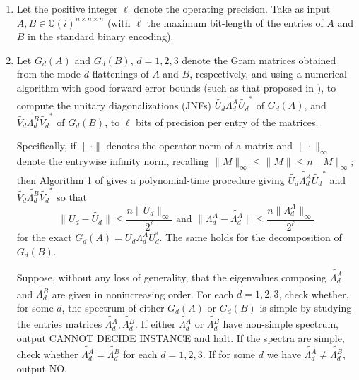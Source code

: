 \documentclass[11pt]{article}
\numberwithin{equation}{section}
\theoremstyle{remark}
\newcommand{\QQ}{\mathbb{Q}}
\begin{document}
\begin{algorithm}[H]
\caption{Compact orbit distance decision procedure for unitary actions.}
\label{alg:2}
    \begin{enumerate}[label=Step \arabic*]
    \item [\textbf{Input}]  Let the positive integer $\ell$ denote the operating precision. Take as input $A, B \in \QQ(i)^{n\times n \times n}$ (with $\ell$ the maximum bit-length of the entries of $A$ and $B$ in the standard binary encoding).
    
    \item\label{alg2Step1}
    Let $G_d(A)$ and $G_d(B)$, $d=1,2,3$ denote the Gram matrices obtained from the mode-$d$ flattenings of $A$ and $B$, respectively, and using a numerical algorithm with good forward error bounds (such as that proposed in \cite{dey2023bit}), to compute the unitary diagonalizations (JNFs) $\widetilde{U_d} \widetilde{\Lambda_d^A} \widetilde{U_d}^*$ of $G_d(A)$, and $\widetilde{V_d} \widetilde{\Lambda_d^B} \widetilde{V_d}^*$ of $G_d(B)$, to $\ell$ bits of precision per entry of the matrices.
    
    Specifically, if $\|\cdot\|$ denotes the operator norm of a matrix and $\|\cdot\|_\infty$ denote the entrywise infinity norm, recalling $\|M\|_\infty\leq \|M\|\leq n\|M\|_\infty$; then Algorithm 1 of \cite{dey2023bit} gives a polynomial-time procedure giving $\widetilde{U_d} \widetilde{\Lambda_d^A} \widetilde{U_d}^*$ and $\widetilde{V_d} \widetilde{\Lambda_d^B} \widetilde{V_d}^*$ so that
    \[
    \|U_d-\widetilde{U_d}\| \leq \frac{n\|U_d\|_\infty}{2^\ell} \text{ and } \|\Lambda_d^A-\widetilde{\Lambda_d^A}\| \leq \frac{n\|\Lambda_d^A\|_\infty}{2^\ell}
    \]
    for the exact $G_d(A) = U_d\Lambda_d^A U_d^*$. The same holds for the decomposition of $G_d(B)$.
    
    Suppose, without any loss of generality, that the eigenvalues composing $\widetilde{\Lambda_d^A}$ and $\widetilde{\Lambda_d^B}$ are given in nonincreasing order.
    For each $d=1,2,3$, check whether, for some $d$, the spectrum of either $G_d(A)$ or $G_d(B)$ is simple by studying the entries matrices $\widetilde{\Lambda_d^A}, \widetilde{\Lambda_d^B}$. If either $\widetilde{\Lambda_d^A}$ or $\widetilde{\Lambda_d^B}$ have non-simple spectrum, output \textsf{CANNOT DECIDE INSTANCE} and halt.
    If the spectra are simple, check whether $\widetilde{\Lambda_d^A} = \widetilde{\Lambda_d^B}$ for each $d=1,2,3$. If for some $d$ we have $\widetilde{\Lambda_d^A} \ne \widetilde{\Lambda_d^B}$, output \textsf{NO}.
    

\end{enumerate}
\end{algorithm}
\end{document}
